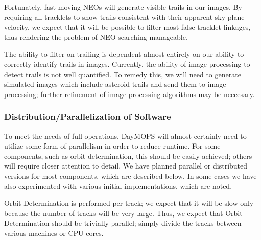 Fortunately, fast-moving NEOs will generate visible trails in our
images.  By requiring all tracklets to show trails consistent with
their apparent sky-plane velocity, we expect that it will be possible
to filter most false tracklet linkages, thus rendering the problem of
NEO searching manageable.

The ability to filter on trailing is dependent almost entirely on our
ability to correctly identify trails in images.  Currently, the
ability of image processing to detect trails is not well quantified.  To
remedy this, we will need to generate simulated images which include
asteroid trails and send them to image processing; further refinement
of image processing algorithms may be neccesary.



\subsubsection{Distribution/Parallelization of Software}
\label{parallelization}

To meet the needs of full operations, DayMOPS will almost certainly
need to utilize some form of parallelism in order to reduce runtime.
For some components, such as orbit determination, this should be
easily achieved; others will require closer attention to detail.  We
have planned parallel or distributed versions for most components,
which are described below.  In some cases we have also experimented
with various initial implementations, which are noted.



 Orbit Determination is
performed per-track; we expect that it will be slow only because the
number of tracks will be very large.  Thus, we expect that Orbit
Determination should be trivially parallel; simply divide the tracks
between various machines or CPU cores. 

